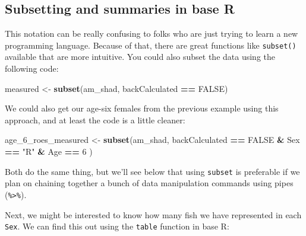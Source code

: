 \documentclass[
]{book}
\newenvironment{Shaded}{\begin{snugshade}}{\end{snugshade}}
\newcommand{\CommentTok}[1]{\textcolor[rgb]{0.56,0.35,0.01}{\textit{#1}}}
\newcommand{\DecValTok}[1]{\textcolor[rgb]{0.00,0.00,0.81}{#1}}
\newcommand{\KeywordTok}[1]{\textcolor[rgb]{0.13,0.29,0.53}{\textbf{#1}}}
\newcommand{\NormalTok}[1]{#1}
\newcommand{\OperatorTok}[1]{\textcolor[rgb]{0.81,0.36,0.00}{\textbf{#1}}}
\newcommand{\OtherTok}[1]{\textcolor[rgb]{0.56,0.35,0.01}{#1}}
\newcommand{\StringTok}[1]{\textcolor[rgb]{0.31,0.60,0.02}{#1}}
\begin{document}
\hypertarget{subsetting-and-summaries-in-base-r}{%
\subsection{Subsetting and summaries in base R}\label{subsetting-and-summaries-in-base-r}}

This notation can be really confusing to folks who are just trying to learn a new programming language. Because of that, there are great functions like \texttt{subset()} available that are more intuitive. You could also subset the data using the following code:

\begin{Shaded}
\begin{Highlighting}[]
\NormalTok{measured <-}\StringTok{ }\KeywordTok{subset}\NormalTok{(am_shad, backCalculated }\OperatorTok{==}\StringTok{ }\OtherTok{FALSE}\NormalTok{)}
\end{Highlighting}
\end{Shaded}

We could also get our age-six females from the previous example using this approach, and at least the code is a little cleaner:

\begin{Shaded}
\begin{Highlighting}[]
\NormalTok{age_}\DecValTok{6}\NormalTok{_roes_measured <-}\StringTok{ }\KeywordTok{subset}\NormalTok{(am_shad,}
\NormalTok{                              backCalculated }\OperatorTok{==}\StringTok{ }\OtherTok{FALSE} \OperatorTok{&}
\StringTok{                                }\NormalTok{Sex }\OperatorTok{==}\StringTok{ "R"} \OperatorTok{&}
\StringTok{                                }\NormalTok{Age }\OperatorTok{==}\StringTok{ }\DecValTok{6}
\NormalTok{                              )}
\end{Highlighting}
\end{Shaded}

Both do the same thing, but we'll see below that using \texttt{subset} is preferable if we plan on chaining together a bunch of data manipulation commands using pipes (\texttt{\%\textgreater{}\%}).

Next, we might be interested to know how many fish we have represented in each \texttt{Sex}. We can find this out using the \texttt{table} function in base R:

\begin{Shaded}
\end{Shaded}
\end{document}
